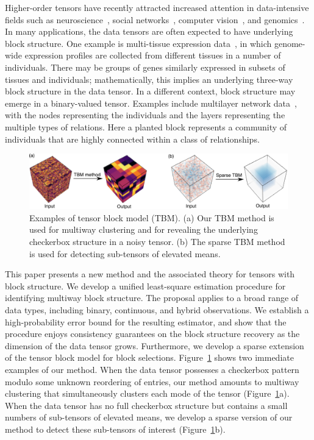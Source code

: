 \documentclass[11pt]{article}
\theoremstyle{plain}
\theoremstyle{definition}
\begin{document}
Higher-order tensors have recently attracted increased attention in data-intensive fields such as neuroscience~\cite{zhou2013tensor}, social networks~\cite{nickel2011three}, computer vision~\cite{tang2013tensor}, and genomics~\cite{wang2017three,hore2016tensor}. In many applications, the data tensors are often expected to have underlying block structure. One example is multi-tissue expression data~\cite{wang2017three}, in which genome-wide expression profiles are collected from different tissues in a number of individuals. There may be groups of genes similarly expressed in subsets of tissues and individuals; mathematically, this implies an underlying three-way block structure in the data tensor. In a different context, block structure may emerge in a binary-valued tensor. Examples include multilayer network data~\cite{nickel2011three}, with the nodes representing the individuals and the layers representing the multiple types of relations. Here a planted block represents a community of individuals that are highly connected within a class of relationships. 

\begin{figure}[h!]

\centering
\includegraphics[width=.8\textwidth]{demo.pdf}
\caption{\small Examples of tensor block model (TBM). (a) Our TBM method is used for multiway clustering and for revealing the underlying checkerbox structure in a noisy tensor. (b) The sparse TBM method is used for detecting sub-tensors of elevated means. }
\label{fig:1}

\end{figure}

This paper presents a new method and the associated theory for tensors with block structure. We develop a unified least-square estimation procedure for identifying multiway block structure. The proposal applies to a broad range of data types, including binary, continuous, and hybrid observations. We establish a high-probability error bound for the resulting estimator, and show that the procedure enjoys consistency guarantees on the block structure recovery as the dimension of the data tensor grows. Furthermore, we develop a sparse extension of the tensor block model for block selections. Figure~\ref{fig:1} shows two immediate examples of our method. When the data tensor possesses a checkerbox pattern modulo some unknown reordering of entries, our method amounts to multiway clustering that simultaneously clusters each mode of the tensor (Figure~\ref{fig:1}a). When the data tensor has no full checkerbox structure but contains a small numbers of sub-tensors of elevated means, we develop a sparse version of our method to detect these sub-tensors of interest (Figure~\ref{fig:1}b). 
\end{document}
